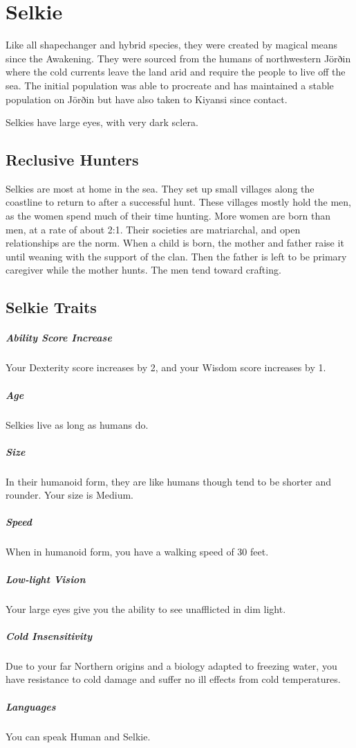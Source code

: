 \section{Selkie}
Like all shapechanger and hybrid species, they were created by magical means since the Awakening.
They were sourced from the humans of northwestern Jörðin where the cold currents leave the land arid and require the people to live off the sea.
The initial population was able to procreate and has maintained a stable population on Jörðin but have also taken to Kiyansi since contact.

Selkies have large eyes, with very dark sclera.

\subsection{Reclusive Hunters}
Selkies are most at home in the sea. 
They set up small villages along the coastline to return to after a successful hunt.
These villages mostly hold the men, as the women spend much of their time hunting.
More women are born than men, at a rate of about 2:1.
Their societies are matriarchal, and open relationships are the norm.
When a child is born, the mother and father raise it until weaning with the support of the clan. 
Then the father is left to be primary caregiver while the mother hunts.
The men tend toward crafting.


\subsection{Selkie Traits}

\subparagraph{Ability Score Increase}
Your Dexterity score increases by 2, and your Wisdom score increases by 1.

\subparagraph{Age}
Selkies live as long as humans do.

\subparagraph{Size}
In their humanoid form, they are like humans though tend to be shorter and rounder.
Your size is Medium.

\subparagraph{Speed}
When in humanoid form, you have a walking speed of 30 feet.

\subparagraph{Low-light Vision}
Your large eyes give you the ability to see unafflicted in dim light.

\subparagraph{Cold Insensitivity}
Due to your far Northern origins and a biology adapted to freezing water, you have resistance to cold damage and suffer no ill effects from cold temperatures.

\subparagraph{Languages}
You can speak Human and Selkie.

